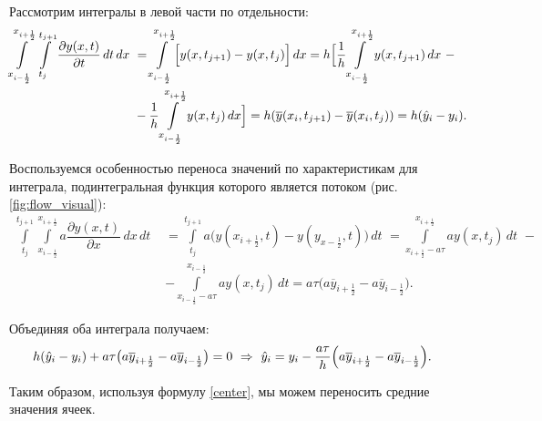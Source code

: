 \documentclass[12pt,a4paper]{article}
\newcommand{\picref}[1]{рис. \ref{#1}}
\newcommand{\half}{\frac{1}{2}}
\newcommand*{\Scale}[2][4]{\scalebox{#1}{$#2$}}
\begin{document}
    Рассмотрим интегралы в левой части по отдельности: 
    \[
        \Scale[0.98] {
            \begin{split}
                \int \limits_{x_{i-\half}}^{x_{i+\half}} \int \limits_{t_j}^{t_{j+1}} \dfrac{ \partial y(x, t) }{ \partial t } \, dt \, dx \,\, &= \int \limits_{x_{i-\half}}^{x_{i+\half}} \Bigl[ y(x, t_{j+1}) - y(x, t_j)  \Bigr] \, dx = h \Bigl[ \dfrac{1}{h} \int \limits_{x_{i-\half}}^{x_{i+\half}} y(x, t_{j+1}) \, dx \,\,  -  \\ 
                &- \dfrac{1}{h} \int \limits_{x_{i-\half}}^{x_{i+\half}} y(x, t_j) \, dx \Bigr] = h ( \overline y(x_i, t_{j+1}) - \overline y(x_i, t_j) ) = h( \hat y_i - y_i).
            \end{split}
        }
    \]

    Воспользуемся особенностью переноса значений по характеристикам для интеграла, подинтегральная функция которого является потоком (\picref{fig:flow_visual}):
    \[
        \begin{split}
            \int \limits_{t_j}^{t_{j+1}} \int \limits_{x_{i-\half}}^{x_{i+\half}} a \dfrac{ \partial y(x,t) }{ \partial x } \, dx \, dt \,\, &= \int \limits_{t_j}^{t_{j+1}} a \bigl( y(x_{i+\half}, t) - y(y_{x-\half}, t) \bigr) \, dt \,\, =  \int \limits_{x_{i+\half}-a\tau}^{x_{i+\half}} a y(x, t_j) \, dt \,\, - \\
            &- \int \limits_{x_{i-\half}-a\tau}^{x_{i-\half}} a y(x, t_j) \, dt = a\tau\bigl( a \overline y_{i+\half} - a \overline y_{i-\half} \bigr).
        \end{split}
    \]

    Объединяя оба интеграла получаем:
    \begin{equation}
        \begin{split}
            h ( \hat y_i - y_i) &+ a\tau\bigl( a \overline y_{i+\half} - a \overline y_{i-\half} \bigr) = 0 \,\, \Rightarrow \,\, \hat y_i = y_i - \dfrac{ a\tau }{ h } \Bigl( a \overline y_{i+\half} - a \overline y_{i-\half} \Bigr).
        \end{split}
        \label{center}
    \end{equation}

    Таким образом, используя формулу \eqref{center}, мы можем переносить средние значения ячеек.

    \pagebreak
\end{document}
